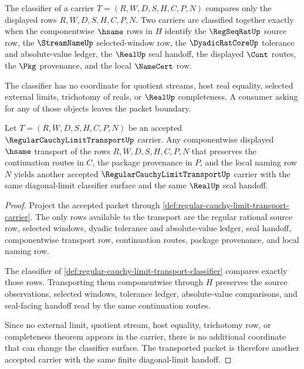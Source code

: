 \begin{definition}
\label{def:regular-cauchy-limit-transport-classifier}
The classifier of a carrier $T=(R,W,D,S,H,C,P,N)$ compares only the displayed rows $R,W,D,S,H,C,P,N$. Two carriers are classified together exactly when the componentwise $\hsame$ rows in $H$ identify the $\RegSeqRatUp$ source row, the $\StreamNameUp$ selected-window row, the $\DyadicRatCoreUp$ tolerance and absolute-value ledger, the $\RealUp$ seal handoff, the displayed $\Cont$ routes, the $\Pkg$ provenance, and the local $\NameCert$ row.

The classifier has no coordinate for quotient streams, host real equality, selected external limits, trichotomy of reals, or $\RealUp$ completeness. A consumer asking for any of those objects leaves the packet boundary.
\end{definition}

\begin{theorem}
\label{thm:regular-cauchy-limit-transport-stability}
Let $T=(R,W,D,S,H,C,P,N)$ be an accepted $\RegularCauchyLimitTransportUp$ carrier. Any componentwise displayed $\hsame$ transport of the rows $R,W,D,S,H,C,P,N$ that preserves the continuation routes in $C$, the package provenance in $P$, and the local naming row $N$ yields another accepted $\RegularCauchyLimitTransportUp$ carrier with the same diagonal-limit classifier surface and the same $\RealUp$ seal handoff.
\end{theorem}
\begin{proof}
Project the accepted packet through \autoref{def:regular-cauchy-limit-transport-carrier}. The only rows available to the transport are the regular rational source row, selected windows, dyadic tolerance and absolute-value ledger, seal handoff, componentwise transport row, continuation routes, package provenance, and local naming row.

The classifier of \autoref{def:regular-cauchy-limit-transport-classifier} compares exactly those rows. Transporting them componentwise through $H$ preserves the source observations, selected windows, tolerance ledger, absolute-value comparisons, and seal-facing handoff read by the same continuation routes.

Since no external limit, quotient stream, host equality, trichotomy row, or completeness theorem appears in the carrier, there is no additional coordinate that can change the classifier surface. The transported packet is therefore another accepted carrier with the same finite diagonal-limit handoff.
\end{proof}


